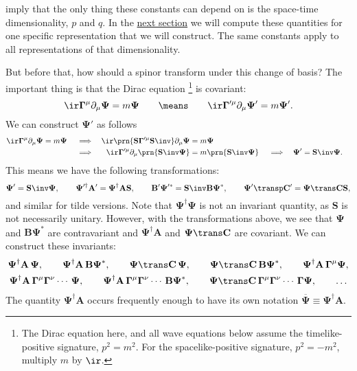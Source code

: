 \documentclass[11pt]{article}
\newcommand{\Gammab}{\boldsymbol{\Gamma}}
\renewcommand{\S}{\mathbf{S}}
\newcommand{\A}{\mathbf{A}}
\newcommand{\B}{\mathbf{B}}
\renewcommand{\C}{\mathbf{C}}
\newcommand{\Psib}{\boldsymbol{\Psi}}
\begin{document}
 imply that the only thing these constants can depend on is the space-time dimensionality, $p$ and $q$.
In the \hyperref[sec:explicit]{next section} we will compute these quantities for one specific representation that we will construct.
The same constants apply to all representations of that dimensionality.

But before that, how should a spinor transform under this change of basis?
The important thing is that the Dirac equation%
\footnote{The Dirac equation here, and all wave equations below assume the timelike-positive signature, \(p^2 = m^2\).
For the spacelike-positive signature, \(p^2 = - m^2\), multiply \(m\) by \(\ir\).} 
is covariant:
%
\begin{equation*}
  \ir \Gammab^\mu \partial_\mu \Psib = m \Psib
  \qquad \means \qquad
  \ir \Gammab'^\mu \partial_\mu \Psib' = m \Psib'.
\end{equation*}
%
We can construct $\Psib'$ as follows
%
\begin{equation*}
\begin{aligned}
  \ir \Gammab^\mu \partial_\mu \Psib &= m \Psib &
  &\implies &
  \ir \prn{\S \Gammab'^\mu \S\inv} \partial_\mu \Psib &= m \Psib \\ &&
  &\implies &
  \ir \Gammab'^\mu \partial_\mu \prn{\S\inv\Psib} &= m \prn{\S\inv\Psib} &
  &\implies &
  \Psib' &= \S\inv \Psib.
\end{aligned}
\end{equation*}
%
This means we have the following transformations:
%
\begin{equation}\label{eq:spinorbasis}
  \Psib' = \S\inv \Psib, \qquad
  \Psib'^\dag \A' = \Psib^\dag \A \S, \qquad
  \B' \Psib'^\ast = \S\inv \B \Psib^\ast, \qquad
  \Psib'\transp \C' = \Psib\trans \C \S,
\end{equation}
%
and similar for tilde versions.
Note that $\Psib^\dag \Psib$ is not an invariant quantity, as \(\S\) is not necessarily unitary.
However, with the transformations above, we see that $\Psib$ and $\B \Psib^\ast$ are contravariant and $\Psib^\dag\A$ and $\Psib\trans \C$ are covariant.
We can construct these invariants:
%
\begin{equation}\label{eq:spinorinvt}
\begin{gathered}
  \Psib^\dag \A\, \Psib, \qquad
  \Psib^\dag \A\, \B \Psib^\ast, \qquad
  \Psib\trans \C\, \Psib, \qquad
  \Psib\trans \C\, \B \Psib^\ast, \qquad
  \Psib^\dag \A\, \Gammab^\mu \Psib, \\
  \Psib^\dag \A\, \Gammab^\mu \Gammab^\nu \cdots\, \Psib, \qquad
  \Psib^\dag \A\, \Gammab^\mu \Gammab^\nu \cdots\, \B \Psib^\ast, \qquad
  \Psib\trans \C\, \Gammab^\mu \Gammab^\nu \cdots\, \Gammab \Psib, \qquad
  \ldots
\end{gathered}
\end{equation}
%
The quantity \( \Psib^\dag \A \) occurs frequently enough to have its own notation \( \overline{\Psib} \equiv \Psib^\dag \A \).
\end{document}
